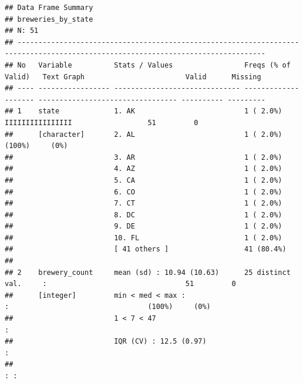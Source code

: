 \documentclass[]{article}
\begin{document}
\begin{verbatim}
## Data Frame Summary   
## breweries_by_state   
## N: 51   
## ---------------------------------------------------------------------------------------------------------------------------------
## No   Variable          Stats / Values                 Freqs (% of Valid)   Text Graph                        Valid      Missing  
## ---- ----------------- ------------------------------ -------------------- --------------------------------- ---------- ---------
## 1    state             1. AK                          1 ( 2.0%)            IIIIIIIIIIIIIIII                  51         0        
##      [character]       2. AL                          1 ( 2.0%)                                              (100%)     (0%)     
##                        3. AR                          1 ( 2.0%)                                                                  
##                        4. AZ                          1 ( 2.0%)                                                                  
##                        5. CA                          1 ( 2.0%)                                                                  
##                        6. CO                          1 ( 2.0%)                                                                  
##                        7. CT                          1 ( 2.0%)                                                                  
##                        8. DC                          1 ( 2.0%)                                                                  
##                        9. DE                          1 ( 2.0%)                                                                  
##                        10. FL                         1 ( 2.0%)                                                                  
##                        [ 41 others ]                  41 (80.4%)                                                                 
## 
## 2    brewery_count     mean (sd) : 10.94 (10.63)      25 distinct val.     :                                 51         0        
##      [integer]         min < med < max :                                   :                                 (100%)     (0%)     
##                        1 < 7 < 47                                          :                                                     
##                        IQR (CV) : 12.5 (0.97)                              :                                                     
##                                                                            : :                                                   

\end{verbatim}
\end{document}
